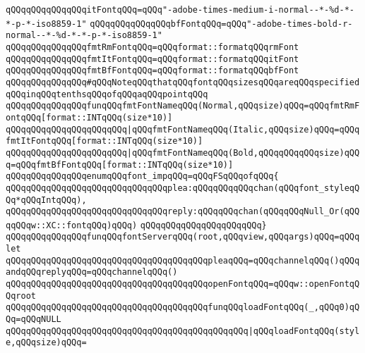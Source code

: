 \verb|qQQqqQQqqQQqqQQqitFontqQQq=qQQq"-adobe-times-medium-i-normal--*-%d-*-*-p-*-iso8859-1"|\newline
\verb|qQQqqQQqqQQqqQQqbfFontqQQq=qQQq"-adobe-times-bold-r-normal--*-%d-*-*-p-*-iso8859-1"|\newline
\newline
\verb|qQQqqQQqqQQqqQQqfmtRmFontqQQq=qQQqformat::formatqQQqrmFont|\newline
\verb|qQQqqQQqqQQqqQQqfmtItFontqQQq=qQQqformat::formatqQQqitFont|\newline
\verb|qQQqqQQqqQQqqQQqfmtBfFontqQQq=qQQqformat::formatqQQqbfFont|\newline
\newline
\verb|qQQqqQQqqQQqqQQq#qQQqNoteqQQqthatqQQqfontqQQqsizesqQQqareqQQqspecifiedqQQqinqQQqtenthsqQQqofqQQqaqQQqpointqQQq|\newline
\verb|qQQqqQQqqQQqqQQqfunqQQqfmtFontNameqQQq(Normal,qQQqsize)qQQq=qQQqfmtRmFontqQQq[format::INTqQQq(size*10)]|\newline
\verb|qQQqqQQqqQQqqQQqqQQqqQQq|\verb#|qQQqfmtFontNameqQQq(Italic,qQQqsize)qQQq=qQQqfmtItFontqQQq[format::INTqQQq(size*10)]#\newline
\verb|qQQqqQQqqQQqqQQqqQQqqQQq|\verb#|qQQqfmtFontNameqQQq(Bold,qQQqqQQqqQQqsize)qQQq=qQQqfmtBfFontqQQq[format::INTqQQq(size*10)]#\newline
\newline
\verb|qQQqqQQqqQQqqQQqenumqQQqfont_impqQQq=qQQqFSqQQqofqQQq{|\newline
\verb|qQQqqQQqqQQqqQQqqQQqqQQqqQQqqQQqplea:qQQqqQQqqQQqchan(qQQqfont_styleqQQq*qQQqIntqQQq),|\newline
\verb|qQQqqQQqqQQqqQQqqQQqqQQqqQQqqQQqreply:qQQqqQQqchan(qQQqqQQqNull_Or(qQQqqQQqw::XC::fontqQQq)qQQq)|\newline
\verb|qQQqqQQqqQQqqQQqqQQqqQQq}|\newline
\newline
\verb|qQQqqQQqqQQqqQQqfunqQQqfontServerqQQq(root,qQQqview,qQQqargs)qQQq=qQQqlet|\newline
\verb|qQQqqQQqqQQqqQQqqQQqqQQqqQQqqQQqqQQqqQQqpleaqQQq=qQQqchannelqQQq()qQQqandqQQqreplyqQQq=qQQqchannelqQQq()|\newline
\verb|qQQqqQQqqQQqqQQqqQQqqQQqqQQqqQQqqQQqqQQqopenFontqQQq=qQQqw::openFontqQQqroot|\newline
\verb|qQQqqQQqqQQqqQQqqQQqqQQqqQQqqQQqqQQqqQQqfunqQQqloadFontqQQq(_,qQQq0)qQQq=qQQqNULL|\newline
\verb|qQQqqQQqqQQqqQQqqQQqqQQqqQQqqQQqqQQqqQQqqQQqqQQq|\verb#|qQQqloadFontqQQq(style,qQQqsize)qQQq=#\newline

